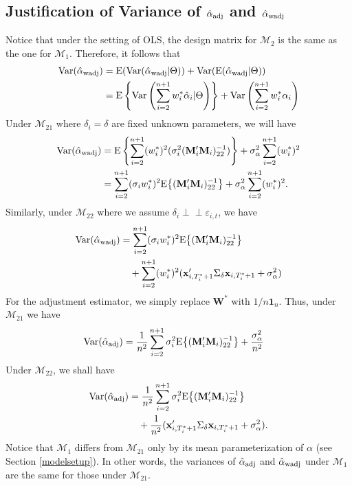 \documentclass[11pt,3p,review,authoryear]{elsarticle}
\def\mbf#1{\mathbf{#1}} %
\newcommand{\indep}{\perp \!\!\! \perp } %
\def\mrm#1{\mathrm{#1}} %
\def\mc#1{\mathcal{#1}} %
\def\E#1{\mathrm{E}(#1)} %
\def\var#1{\mathrm{Var}(#1)} %
\theoremstyle{definition}
\begin{document}
\subsection{Justification of Variance of $\hat{\alpha}_{\rm adj}$ and $\hat{\alpha}_{\rm wadj}$}
\label{var}

Notice that under the setting of OLS, the design matrix for $\mc{M}_2$ is the same as the one for $\mc{M}_1$. Therefore, it follows that
  \begin{align*}
  \var{\hat{\alpha}_{\rm wadj}} 
  &= \E{\var{\hat{\alpha}_{\rm wadj}|\Theta}} + \var{\E{\hat{\alpha}_{\rm wadj}|\Theta}} \\
  &=\mrm{E} \left\{\mrm{Var}\left(\sum_{i=2}^{n+1} w_i^*\hat{\alpha}_i|\Theta\right)\right\} +\mrm{Var}\left(\sum_{i=2}^{n+1} w_i^*\alpha_i\right) 
\end{align*}
Under $\mc{M}_{21}$ where $\delta_i=\delta$ are fixed unknown parameters,  we will have
  \begin{align}
  \var{\hat{\alpha}_{\rm wadj}} 
  &= \mrm{E} \left\{\sum_{i=2}^{n+1}(w_i^*)^2(\sigma_i^2(\mbf{M}'_i\mbf{M}_i)^{-1}_{22})\right\} +\sigma^2_{\alpha}\sum_{i=2}^{n+1}(w_i^*)^2  \nonumber\\
  &= \sum_{i=2}^{n+1}(\sigma_i w_i^*)^2\mrm{E}\big\{(\mbf{M}'_i\mbf{M}_i)^{-1}_{22}\big\}+\sigma^2_{\alpha}\sum_{i=2}^{n+1}(w_i^*)^2.\label{equation6}
\end{align}
Similarly, under $\mc{M}_{22}$ where we assume $\delta_i \indep \varepsilon_{i,t}$, we have
 \begin{align*}
  \var{\hat{\alpha}_{\rm wadj}} 
  &= \sum_{i=2}^{n+1}(\sigma_i w_i^*)^2\mrm{E}\big\{(\mbf{M}'_i\mbf{M}_i)^{-1}_{22}\big\}\\
 & \quad  + \sum_{i=2}^{n+1} (w_i^*)^2 (\mbf{x}_{i, T_i^*+1}'\Sigma_{\delta}\mbf{x}_{i, T_i^*+1} + \sigma^2_{\alpha})
\end{align*}
For the adjustment estimator, we simply replace $\mbf{W}^*$ with $1/n\mbf{1}_n$. Thus, under $\mc{M}_{21}$ we have 
 \begin{align*}
  \var{\hat{\alpha}_{\rm adj}} 
  &=\frac{1}{n^2}\sum_{i=2}^{n+1} \sigma_i^2\mrm{E}\big\{(\mbf{M}'_i\mbf{M}_i)^{-1}_{22}\big\}+\frac{\sigma^2_{\alpha}}{n^2}
\end{align*}
Under $\mc{M}_{22}$, we shall have
 \begin{align*}
  \var{\hat{\alpha}_{\rm adj}} 
  &=\frac{1}{n^2}\sum_{i=2}^{n+1}\sigma_i^2\mrm{E}\big\{(\mbf{M}'_i\mbf{M}_i)^{-1}_{22}\big\}\\
  & \quad  +\frac{1}{n^2}(\mbf{x}_{i, T_i^*+1}'\Sigma_{\delta}\mbf{x}_{i, T_i^*+1} + \sigma^2_{\alpha}).
\end{align*}
Notice that $\mc{M}_{1}$ differs from $\mc{M}_{21}$ only by its mean parameterization of $\alpha$ (see Section \ref{modelsetup}). In other words, the variances of $\hat{\alpha}_{\rm adj}$ and $\hat{\alpha}_{\rm wadj}$ under $\mc{M}_1$ are the same for those under $\mc{M}_{21}$.
\end{document}
